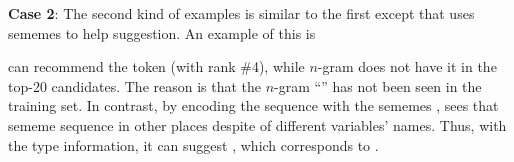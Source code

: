 


\vspace{0.04in}
\noindent
\textbf{Case 2}: The second kind of examples is similar to the first
except that {\tool} uses sememes to help suggestion. An example of this
is

{\tool} can recommend the token  (with rank \#4), while
$n$-gram does not have it in the top-20 candidates. The reason is that
the $n$-gram ``'' has not been seen
in the training set. In contrast, by encoding the sequence with the
sememes , {\tool} sees that sememe
sequence in other places despite of different variables' names. Thus,
with the type information, it can suggest , which corresponds to .

%





%
